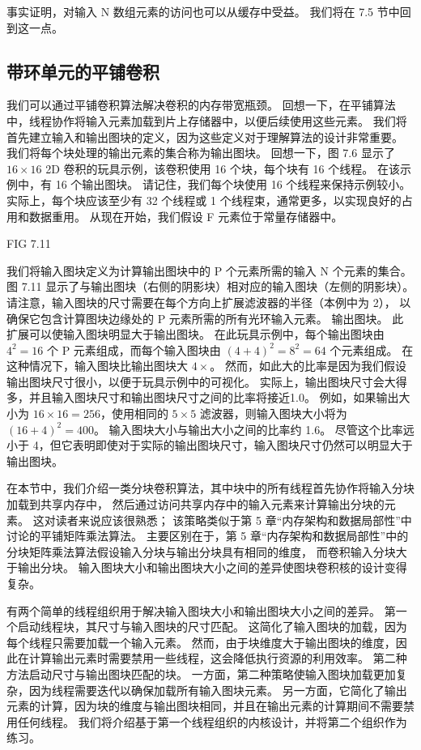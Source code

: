 事实证明，对输入 N 数组元素的访问也可以从缓存中受益。 我们将在 7.5 节中回到这一点。

\subsection{带环单元的平铺卷积}
我们可以通过平铺卷积算法解决卷积的内存带宽瓶颈。 
回想一下，在平铺算法中，线程协作将输入元素加载到片上存储器中，以便后续使用这些元素。 
我们将首先建立输入和输出图块的定义，因为这些定义对于理解算法的设计非常重要。 
我们将每个块处理的输出元素的集合称为输出图块。 
回想一下，图 7.6 显示了 $16 \times 16$ 2D 卷积的玩具示例，该卷积使用 16 个块，每个块有 16 个线程。 
在该示例中，有 16 个输出图块。 请记住，我们每个块使用 16 个线程来保持示例较小。 
实际上，每个块应该至少有 32 个线程或 1 个线程束，通常更多，以实现良好的占用和数据重用。 
从现在开始，我们假设 F 元素位于常量存储器中。

{\color{red} FIG 7.11}

我们将输入图块定义为计算输出图块中的 P 个元素所需的输入 N 个元素的集合。 
图 7.11 显示了与输出图块（右侧的阴影块）相对应的输入图块（左侧的阴影块）。 
请注意，输入图块的尺寸需要在每个方向上扩展滤波器的半径（本例中为 2），
以确保它包含计算图块边缘处的 P 元素所需的所有光环输入元素。 
输出图块。 此扩展可以使输入图块明显大于输出图块。 
在此玩具示例中，每个输出图块由 $4^2 = 16$ 个 P 元素组成，而每个输入图块由 $(4 + 4)^2 = 8^2 = 64$ 个元素组成。 
在这种情况下，输入图块比输出图块大 $4\times$。 然而，如此大的比率是因为我们假设输出图块尺寸很小，以便于玩具示例中的可视化。 
实际上，输出图块尺寸会大得多，并且输入图块尺寸和输出图块尺寸之间的比率将接近1.0。 
例如，如果输出大小为 $16 \times 16 = 256$，使用相同的 $5 \times 5$ 滤波器，则输入图块大小将为 $(16 + 4)^2 = 400$。
输入图块大小与输出大小之间的比率约 1.6。 
尽管这个比率远小于 4，但它表明即使对于实际的输出图块尺寸，输入图块尺寸仍然可以明显大于输出图块。

在本节中，我们介绍一类分块卷积算法，其中块中的所有线程首先协作将输入分块加载到共享内存中，
然后通过访问共享内存中的输入元素来计算输出分块的元素。 
这对读者来说应该很熟悉； 该策略类似于第 5 章“内存架构和数据局部性”中讨论的平铺矩阵乘法算法。 
主要区别在于，第 5 章“内存架构和数据局部性”中的分块矩阵乘法算法假设输入分块与输出分块具有相同的维度，
而卷积输入分块大于输出分块。 输入图块大小和输出图块大小之间的差异使图块卷积核的设计变得复杂。

有两个简单的线程组织用于解决输入图块大小和输出图块大小之间的差异。 
第一个启动线程块，其尺寸与输入图块的尺寸匹配。 这简化了输入图块的加载，因为每个线程只需要加载一个输入元素。 
然而，由于块维度大于输出图块的维度，因此在计算输出元素时需要禁用一些线程，这会降低执行资源的利用效率。 
第二种方法启动尺寸与输出图块匹配的块。 
一方面，第二种策略使输入图块加载更加复杂，因为线程需要迭代以确保加载所有输入图块元素。 
另一方面，它简化了输出元素的计算，因为块的维度与输出图块相同，并且在输出元素的计算期间不需要禁用任何线程。 
我们将介绍基于第一个线程组织的内核设计，并将第二个组织作为练习。


